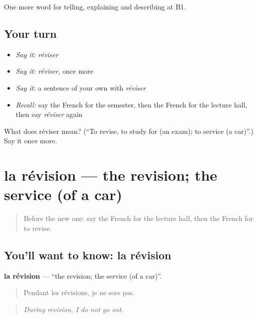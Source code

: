 \begin{grammarlens}[title={What you've built}]
One more word for telling, explaining and describing at B1.
\end{grammarlens}

\subsection*{Your turn}
\begin{itemize}
\raggedright
  \item \emph{Say it:} \emph{réviser}
  \item \emph{Say it:} \emph{réviser}, once more
  \item \emph{Say it:} a sentence of your own with \emph{réviser}
  \item \emph{Recall:} say the French for the semester, then the French for the lecture hall, then say \emph{réviser} again
\end{itemize}

\begin{tcolorbox}[breakable,colback=teal!4,colframe=teal!35!black,title={Before you move on}]
What does réviser mean? (\textquotedblleft{}To revise, to study for (an exam); to service (a car)\textquotedblright{}.) Say it once more.
\end{tcolorbox}
\section[la révision]{la révision — the revision; the service (of a car)}

\label{lesson:FR-C377-revision}



\begin{quote}
Before the new one: say the French for the lecture hall, then the French for to revise.
\end{quote}

\subsection*{You'll want to know: la révision}
\textbf{la révision} — \textquotedblleft{}the revision; the service (of a car)\textquotedblright{}.

\begin{quote}
Pendant les révisions, je ne sors pas.
\end{quote}

\begin{quote}
\emph{During revision, I do not go out.}
\end{quote}

